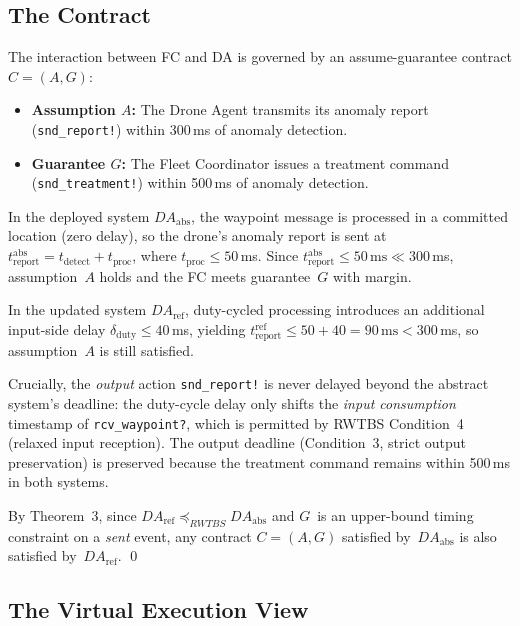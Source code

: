 \documentclass[11pt,a4paper]{article}
\newcommand{\DAabs}{\mathit{DA}_{\mathrm{abs}}}
\newcommand{\DAref}{\mathit{DA}_{\mathrm{ref}}}
\newcommand{\RWTBS}{RWTBS}
\begin{document}
\subsection{The Contract}
\label{sec:contract}

The interaction between FC and DA is governed by an assume-guarantee contract
$C = (A, G)$:

\begin{itemize}[nosep]
  \item \textbf{Assumption $A$:} The Drone Agent transmits its anomaly report
    (\texttt{snd\_report!}) within 300\,ms of anomaly detection.
  \item \textbf{Guarantee $G$:} The Fleet Coordinator issues a treatment
    command (\texttt{snd\_treatment!}) within 500\,ms of anomaly detection.
\end{itemize}

\noindent
In the deployed system $\DAabs$, the waypoint message is processed in a
committed location (zero delay), so the drone's anomaly report is sent at
$t_{\mathrm{report}}^{\mathrm{abs}} = t_{\mathrm{detect}} +
t_{\mathrm{proc}}$, where $t_{\mathrm{proc}} \leq 50$\,ms.  Since
$t_{\mathrm{report}}^{\mathrm{abs}} \leq 50\,\text{ms} \ll 300$\,ms,
assumption~$A$ holds and the FC meets guarantee~$G$ with margin.

In the updated system $\DAref$, duty-cycled processing introduces an additional
input-side delay $\delta_{\mathrm{duty}} \leq 40$\,ms, yielding
$t_{\mathrm{report}}^{\mathrm{ref}} \leq 50 + 40 = 90\,\text{ms} <
300$\,ms, so assumption~$A$ is still satisfied.

Crucially, the \emph{output} action \texttt{snd\_report!} is never delayed
beyond the abstract system's deadline: the duty-cycle delay only shifts the
\emph{input consumption} timestamp of \texttt{rcv\_waypoint?}, which is
permitted by \RWTBS{} Condition~4 (relaxed input reception).  The output
deadline (Condition~3, strict output preservation) is preserved because the
treatment command remains within 500\,ms in both systems.

By Theorem~3, since
$\DAref \preceq_{\RWTBS{}} \DAabs$ and $G$~is an upper-bound timing constraint
on a \emph{sent} event, any contract $C = (A, G)$ satisfied by~$\DAabs$ is also
satisfied by~$\DAref$.  \qed

\subsection{The Virtual Execution View}
\label{sec:vev}
\end{document}
